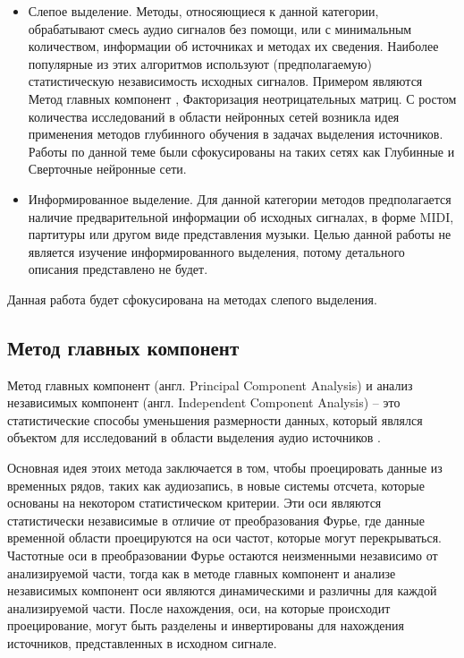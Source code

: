 \begin{itemize}
	\item Слепое выделение. Методы, относяющиеся к данной категории, обрабатывают смесь аудио сигналов без помощи, или с минимальным количеством, информации об источниках и методах их сведения. Наиболее популярные из этих алгоритмов используют (предполагаемую) статистическую независимость исходных сигналов. Примером являются Метод главных компонент \cite{Lopez} \cite{Dadula}, Факторизация неотрицательных матриц. С ростом количества исследований в области нейронных сетей возникла идея применения методов глубинного обучения в задачах выделения источников. Работы по данной теме были сфокусированы на таких сетях как Глубинные и Сверточные нейронные сети.
	\item Информированное выделение. Для данной категории методов предполагается наличие предварительной информации об исходных сигналах, в форме MIDI, партитуры или другом виде представления музыки\cite{Miron}. Целью данной работы не является изучение информированного выделения, потому детального описания представлено не будет.
\end{itemize}

Данная работа будет сфокусирована на методах слепого выделения.

\subsection{Метод главных компонент}
Метод главных компонент (англ. Principal Component Analysis) и анализ независимых компонент (англ. Independent Component Analysis) -- это статистические способы уменьшения размерности данных, который являлся объектом для исследований в области выделения аудио источников \cite{Lopez} \cite{Dadula}.

Основная идея этоих метода заключается в том, чтобы проецировать данные из временных рядов, таких как аудиозапись, в новые системы отсчета, которые основаны на некотором статистическом критерии. Эти оси являются статистически независимые в отличие от преобразования Фурье, где данные временной области проецируются на оси частот, которые могут перекрываться. Частотные оси в преобразовании Фурье остаются неизменными независимо от анализируемой части, тогда как в методе главных компонент и анализе независимых компонент оси являются динамическими и различны для каждой анализируемой части. После нахождения, оси, на которые происходит проецирование, могут быть разделены и инвертированы для нахождения источников, представленных в исходном сигнале.


